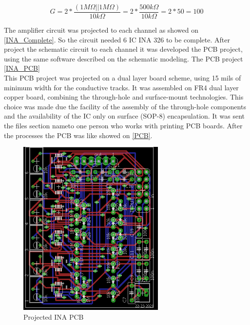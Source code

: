 \begin{equation}
  \label{Gain}
G=2*\frac{(1M\Omega||1M\Omega)}{10k\Omega}
=2*\frac{500k\Omega}{10k\Omega}
=2*50
=100
\end{equation}

The amplifier circuit was projected to each channel as showed on \autoref{INA_Complete}.
So the circuit needed 6 IC INA 326 to be complete.  After project
the schematic circuit to each channel it was developed the PCB project, using the
same software described on the schematic modeling. The PCB project \autoref{INA_PCB}\\


This PCB project \label{INA_PCB_doc} was projected on a dual layer board scheme, using 15 mils of
minimum width for the conductive tracks. It was assembled on FR4 dual layer copper
board, combining the through-hole and surface-mount technologies. This choice was
made due the facility of the assembly of the through-hole components and the availability
of the IC only on surface (SOP-8) encapsulation. It was sent
the files section nameto one person who works with printing PCB boards. After the processes
the PCB was like showed on \autoref{PCB}.\\

\begin{figure}[!htpb]
\centering
\caption{Projected INA PCB}
\label{INA_PCB}
\includegraphics[scale=1.8]{images/TCC_INA}
\end{figure}

